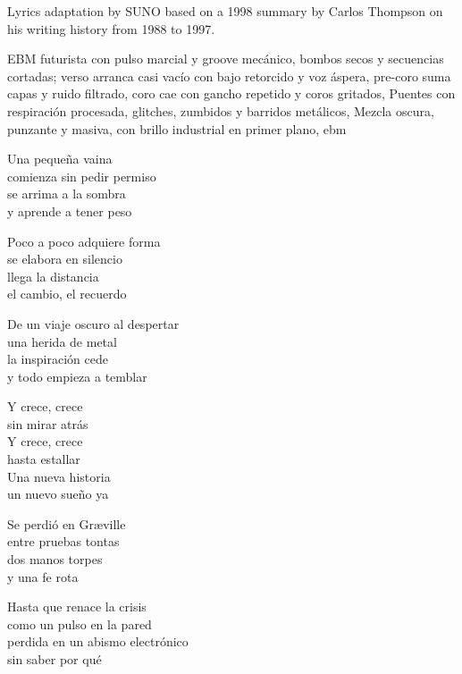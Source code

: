 
\begin{notes}
Lyrics adaptation by SUNO based on a 1998 summary by Carlos Thompson on his writing history from 1988 to 1997.
\end{notes}
\begin{style}
EBM futurista con pulso marcial y groove mecánico, bombos secos y secuencias cortadas; verso arranca casi vacío con bajo retorcido y voz áspera, pre-coro suma capas y ruido filtrado, coro cae con gancho repetido y coros gritados, Puentes con respiración procesada, glitches, zumbidos y barridos metálicos, Mezcla oscura, punzante y masiva, con brillo industrial en primer plano, ebm
\end{style}
\begin{lyrics}
Una pequeña vaina\\
comienza sin pedir permiso\\
se arrima a la sombra\\
y aprende a tener peso

Poco a poco adquiere forma\\
se elabora en silencio\\
llega la distancia\\
el cambio, el recuerdo

De un viaje oscuro al despertar\\
una herida de metal\\
la inspiración cede\\
y todo empieza a temblar

Y crece, crece\\
sin mirar atrás\\
Y crece, crece\\
hasta estallar\\
Una nueva historia\\
un nuevo sueño ya

Se perdió en Græville\\
entre pruebas tontas\\
dos manos torpes\\
y una fe rota

Hasta que renace la crisis\\
como un pulso en la pared\\
perdida en un abismo electrónico\\
sin saber por qué


\end{lyrics}
